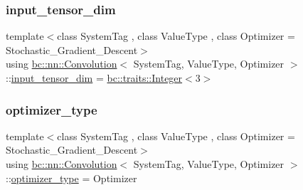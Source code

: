 \mbox{\label{structbc_1_1nn_1_1Convolution_a4b9d52a3c24e2e44ae51e0e06819bf45}} 
\subsubsection{\texorpdfstring{input\+\_\+tensor\+\_\+dim}{input\_tensor\_dim}}
{\footnotesize\ttfamily template$<$class System\+Tag , class Value\+Type , class Optimizer  = Stochastic\+\_\+\+Gradient\+\_\+\+Descent$>$ \\
using \hyperlink{structbc_1_1nn_1_1Convolution}{bc\+::nn\+::\+Convolution}$<$ System\+Tag, Value\+Type, Optimizer $>$\+::\hyperlink{structbc_1_1nn_1_1Convolution_a4b9d52a3c24e2e44ae51e0e06819bf45}{input\+\_\+tensor\+\_\+dim} =  \hyperlink{structbc_1_1traits_1_1Integer}{bc\+::traits\+::\+Integer}$<$3$>$}

\mbox{\label{structbc_1_1nn_1_1Convolution_a32c8282bec07115a029de6a8c6a34edf}} 
\subsubsection{\texorpdfstring{optimizer\+\_\+type}{optimizer\_type}}
{\footnotesize\ttfamily template$<$class System\+Tag , class Value\+Type , class Optimizer  = Stochastic\+\_\+\+Gradient\+\_\+\+Descent$>$ \\
using \hyperlink{structbc_1_1nn_1_1Convolution}{bc\+::nn\+::\+Convolution}$<$ System\+Tag, Value\+Type, Optimizer $>$\+::\hyperlink{structbc_1_1nn_1_1Convolution_a32c8282bec07115a029de6a8c6a34edf}{optimizer\+\_\+type} =  Optimizer}

\mbox{\label{structbc_1_1nn_1_1Convolution_a20d103087eb0fa4c47e9640eae02e401}} 
